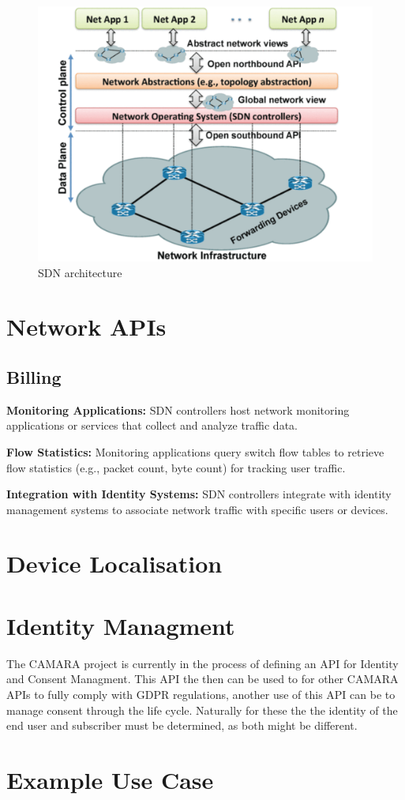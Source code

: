 \documentclass[conference]{IEEEtran}
\begin{document}
\cite{6994333}
\begin{figure}[htbp]
	\centering
	\includegraphics[width=0.8\linewidth]{pics/sdn_architecture.png}
	\caption{SDN architecture}
	\label{fig:sdn}
\end{figure}

\section{Network APIs}\label{AA}

\subsection{Billing}
\textbf{Monitoring Applications:} SDN controllers host network monitoring applications or services that collect and analyze traffic data.

\textbf{Flow Statistics:} Monitoring applications query switch flow tables to retrieve flow statistics (e.g., packet count, byte count) for tracking user traffic.

\textbf{Integration with Identity Systems:} SDN controllers integrate with identity management systems to associate network traffic with specific users or devices.

\section{Device Localisation}

\section{Identity Managment}
The CAMARA project is currently in the process of defining an API for Identity and Consent Managment. This API the then can be used to for other CAMARA APIs to fully comply with GDPR regulations, another use of this API can be to manage consent through the life cycle. Naturally for these the the identity of the end user and subscriber must be determined, as both might be different. \cite{identity}

\section{Example Use Case}



	
	
\end{document}
